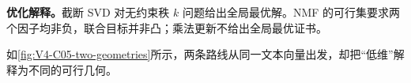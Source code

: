 \documentclass[UTF8,a4paper,11pt,openany]{ctexbook}
\begin{document}
\setcounter{page}{644}
\setcounter{chapter}{28}
\setcounter{figure}{0}
\pagestyle{headings}
\begin{optimizationbox}
\textbf{优化解释。}截断 SVD 对无约束秩 $k$ 问题给出全局最优解。NMF 的可行集要求两个因子均非负，联合目标并非凸；乘法更新不给出全局最优证书。
\end{optimizationbox}
如\cref{fig:V4-C05-two-geometries}所示，两条路线从同一文本向量出发，却把“低维”解释为不同的可行几何。

\end{document}
